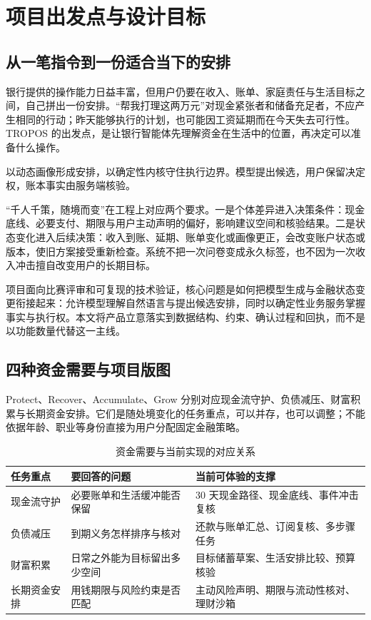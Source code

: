 \section{项目出发点与设计目标}
\label{sec:positioning}
\subsection{从一笔指令到一份适合当下的安排}
银行提供的操作能力日益丰富，但用户仍要在收入、账单、家庭责任与生活目标之间，自己拼出一份安排。“帮我打理这两万元”对现金紧张者和储备充足者，不应产生相同的行动；昨天能够执行的计划，也可能因工资延期而在今天失去可行性。TROPOS 的出发点，是让银行智能体先理解资金在生活中的位置，再决定可以准备什么操作。

\begin{keybox}[核心设计]
以动态画像形成安排，以确定性内核守住执行边界。模型提出候选，用户保留决定权，账本事实由服务端核验。
\end{keybox}

“千人千策，随境而变”在工程上对应两个要求。一是个体差异进入决策条件：现金底线、必要支付、期限与用户主动声明的偏好，影响建议空间和核验结果。二是状态变化进入后续决策：收入到账、延期、账单变化或画像更正，会改变账户状态或版本，使旧方案接受重新检查。系统不把一次问卷变成永久标签，也不因为一次收入冲击擅自改变用户的长期目标。

项目面向比赛评审和可复现的技术验证，核心问题是如何把模型生成与金融状态变更衔接起来：允许模型理解自然语言与提出候选安排，同时以确定性业务服务掌握事实与执行权。本文将产品立意落实到数据结构、约束、确认过程和回执，而不是以功能数量代替这一主线。

\subsection{四种资金需要与项目版图}
Protect、Recover、Accumulate、Grow 分别对应现金流守护、负债减压、财富积累与长期资金安排。它们是随处境变化的任务重点，可以并存，也可以调整；不能依据年龄、职业等身份直接为用户分配固定金融策略。

\begin{table}[htbp]\centering\small
\caption{资金需要与当前实现的对应关系}
\begin{tabularx}{\textwidth}{@{}L{2.2cm}YY@{}}\toprule
任务重点 & 要回答的问题 & 当前可体验的支撑 \\\midrule
现金流守护 & 必要账单和生活缓冲能否保留 & 30 天现金路径、现金底线、事件冲击复核 \\
负债减压 & 到期义务怎样排序与核对 & 还款与账单汇总、订阅复核、多步骤任务 \\
财富积累 & 日常之外能为目标留出多少空间 & 目标储蓄草案、生活安排比较、预算核验 \\
长期资金安排 & 用钱期限与风险约束是否匹配 & 主动风险声明、期限与流动性核对、理财沙箱 \\\bottomrule
\end{tabularx}
\end{table}

